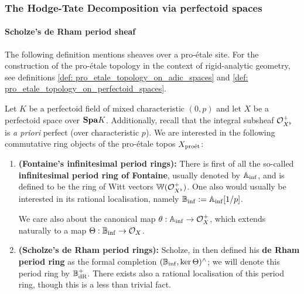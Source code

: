             \subsubsection{The Hodge-Tate Decomposition via perfectoid spaces}
                \paragraph{Scholze's de Rham period sheaf}
                    The following definition mentions sheaves over a pro-\'etale site. For the construction of the pro-\'etale topology in the context of rigid-analytic geometry, see definitions \ref{def: pro_etale_topology_on_adic_spaces} and \ref{def: pro_etale_topology_on_perfectoid_spaces}. 
                    \begin{definition} \label{def: de_rham_period_sheaves}
                        Let $K$ be a perfectoid field of mixed characteristic $(0, p)$ and let $X$ be a perfectoid space over $\mathbf{Spa} K$. Additionally, recall that the integral subsheaf $\mathcal{O}_{X^{\flat}}^+$ is \textit{a priori} perfect (over characteristic $p$). We are interested in the following commutative ring objects of the pro-\'etale topos $X_{\mathrm{pro\acute{e}t}}$:
                            \begin{enumerate}
                                \item \textbf{(Fontaine's infinitesimal period rings):} There is first of all the so-called \textbf{infinitesimal period ring of Fontaine}, usually denoted by $\mathbb{A}_{\inf}$, and is defined to be the ring of Witt vectors $\mathbb{W}(\mathcal{O}_{X^{\flat}}^+)$. One also would usually be interested in its rational localisation, namely $\mathbb{B}_{\inf} := \mathbb{A}_{\inf}[1/p]$. 
                                
                                We care also about the canonical map $\theta: \mathbb{A}_{\inf} \to \mathcal{O}_X^+$, which extends naturally to a map $\Theta: \mathbb{B}_{\inf} \to \mathcal{O}_X$.
                                \item \textbf{(Scholze's de Rham period rings):} Scholze, in \cite[Definition 6.1]{scholze2012padic} then defined his \textbf{de Rham period ring} as the formal completion $(\mathbb{B}_{\inf}, \ker \Theta)^{\wedge}$; we will denote this period ring by $\mathbb{B}_{\mathrm{dR}}^+$. There exists also a rational localisation of this period ring, though this is a less than trivial fact.
                            \end{enumerate}
                    \end{definition}
                    

